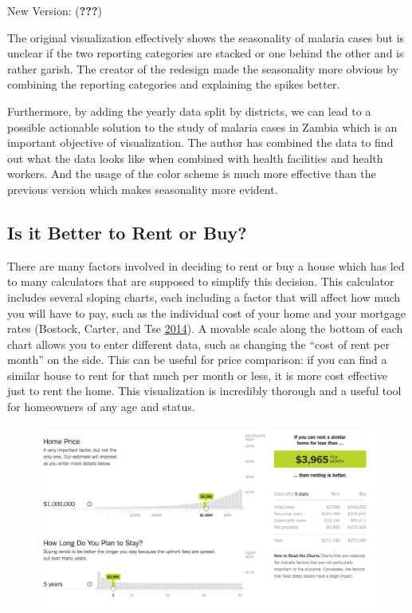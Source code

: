\documentclass[]{book}
\theoremstyle{definition}
\theoremstyle{definition}
\theoremstyle{definition}
\theoremstyle{remark}
\begin{document}
New Version: ({\textbf{???}})

The original visualization effectively shows the seasonality of malaria
cases but is unclear if the two reporting categories are stacked or one
behind the other and is rather garish. The creator of the redesign made
the seasonality more obvious by combining the reporting categories and
explaining the spikes better.

Furthermore, by adding the yearly data split by districts, we can lead
to a possible actionable solution to the study of malaria cases in
Zambia which is an important objective of visualization. The author has
combined the data to find out what the data looks like when combined
with health facilities and health workers. And the usage of the color
scheme is much more effective than the previous version which makes
seasonality more evident.

\subsection{Is it Better to Rent or
Buy?}\label{is-it-better-to-rent-or-buy}

There are many factors involved in deciding to rent or buy a house which
has led to many calculators that are supposed to simplify this decision.
This calculator includes several sloping charts, each including a factor
that will affect how much you will have to pay, such as the individual
cost of your home and your mortgage rates (Bostock, Carter, and Tse
\protect\hyperlink{ref-rent_or_buy}{2014}). A movable scale along the
bottom of each chart allows you to enter different data, such as
changing the ``cost of rent per month'' on the side. This can be useful
for price comparison: if you can find a similar house to rent for that
much per month or less, it is more cost effective just to rent the home.
This visualization is incredibly thorough and a useful tool for
homeowners of any age and status.

\begin{figure}
\centering
\includegraphics{images/rentcalc.png}
\caption{}
\end{figure}
\end{document}
